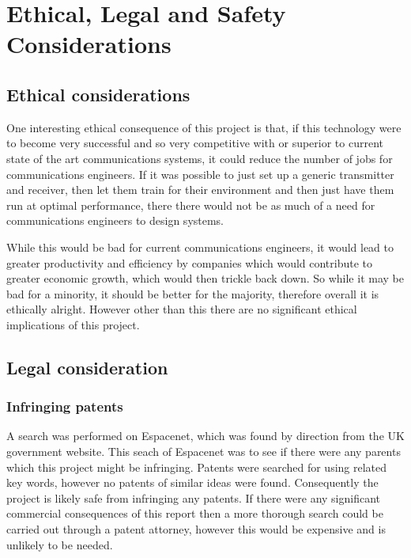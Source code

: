 \documentclass[12pt,onecolumn,letterpaper]{article}
\begin{document}
\section{Ethical, Legal and Safety Considerations}

\subsection{Ethical considerations}

One interesting ethical consequence of this project is that, if this technology were to become very successful and so very competitive with or superior to current state of the art communications systems, it could reduce the number of jobs for communications engineers. If it was possible to just set up a generic transmitter and receiver, then let them train for their environment and then just have them run at optimal performance, there there would not be as much of a need for communications engineers to design systems.

While this would be bad for current communications engineers, it would lead to greater productivity and efficiency by companies which would contribute to greater economic growth, which would then trickle back down. So while it may be bad for a minority, it should be better for the majority, therefore overall it is ethically alright. However other than this there are no significant ethical implications of this project.

\subsection{Legal consideration}

\subsubsection{Infringing patents}

A search was performed on Espacenet, which was found by direction from the UK government website. This seach of Espacenet was to see if there were any parents which this project might be infringing. Patents were searched for using related key words, however no patents of similar ideas were found. Consequently the project is likely safe from infringing any patents. If there were any significant commercial consequences of this report then a more thorough search could be carried out through a patent attorney, however this would be expensive and is unlikely to be needed.
\end{document}
